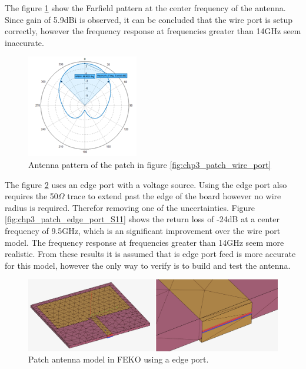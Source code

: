 The figure \ref{fig:chp3_patch_wire_port_pattern} show the Farfield pattern at the center frequency of the antenna. Since gain of 5.9dBi is observed, it can be concluded that the wire port is setup correctly, however the frequency response at frequencies greater than 14GHz seem inaccurate.

    \begin{figure}[H]
    \centering
    \includegraphics[width=0.4\linewidth]{Figures/chp3_patch_wire_port_pattern.png}
    \caption{Antenna pattern of the patch in figure \ref{fig:chp3_patch_wire_port}}
    \label{fig:chp3_patch_wire_port_pattern}
    \end{figure}

The figure \ref{fig:chp3_patch_edge_port} uses an edge port with a voltage source. Using the edge port also requires the 50$\Omega$ trace to extend past the edge of the board however no wire radius is required. Therefor removing one of the uncertainties. Figure \ref{fig:chp3_patch_edge_port_S11} shows the return loss of -24dB at a center frequency of 9.5GHz, which is an significant improvement over the wire port model. The frequency response at frequencies greater than 14GHz seem more realistic. From these results it is assumed that is edge port feed is more accurate for this model, however the only way to verify is to build and test the antenna.

    \begin{figure}[H]
    \centering
    \includegraphics[width=0.7\linewidth]{Figures/chp3_patch_edge_port.png}
    \caption{Patch antenna model in FEKO using a edge port.}
    \label{fig:chp3_patch_edge_port}
    \end{figure}

